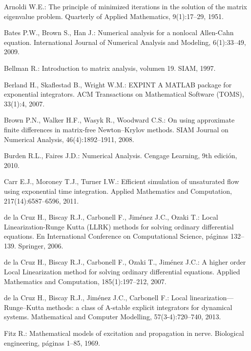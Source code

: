 %
%
\begin{thebibliography}{99}
	
 Arnoldi W.E.: The principle of minimized iterations in the solution of the matrix eigenvalue
problem. Quarterly of Applied Mathematics, 9(1):17–29, 1951.

 Bates P.W., Brown S., Han J.: Numerical analysis for a nonlocal Allen-Cahn
equation. International Journal of Numerical Analysis and Modeling, 6(1):33–49, 2009.

 Bellman R.: Introduction to matrix analysis, volumen 19. SIAM, 1997.

 Berland H., Skaflestad B., Wright W.M.: EXPINT A MATLAB package for exponential
integrators. ACM Transactions on Mathematical Software (TOMS), 33(1):4, 2007.

 Brown P.N., Walker H.F., Wasyk R., Woodward C.S.: On using approximate
finite differences in matrix-free Newton–Krylov methods. SIAM Journal on Numerical Analysis,
46(4):1892–1911, 2008.

 Burden R.L., Faires J.D.: Numerical Analysis. Cengage Learning, 9th edición,
2010.

 Carr E.J., Moroney T.J., Turner I.W.: Efficient simulation of unsaturated flow
using exponential time integration. Applied Mathematics and Computation, 217(14):6587–6596,
2011.

 de la Cruz H., Biscay R.J., Carbonell F., Jiménez J.C., Ozaki T.: Local
Linearization-Runge Kutta (LLRK) methods for solving ordinary differential equations. En
International Conference on Computational Science, páginas 132–139. Springer, 2006.

 de la Cruz H., Biscay R.J.,  Carbonell F., Ozaki T., Jiménez J.C.: A higher
order Local Linearization method for solving ordinary differential equations. Applied Mathematics
and Computation, 185(1):197–212, 2007.

 de la Cruz H., Biscay R.J., Jiménez J.C., Carbonell F.: Local
linearization—Runge–Kutta methods: a class of A-stable explicit integrators for dynamical systems.
Mathematical and Computer Modelling, 57(3-4):720–740, 2013.

 Fitz R.: Mathematical models of excitation and propagation in nerve. Biological
engineering, páginas 1–85, 1969.


\end{thebibliography}
